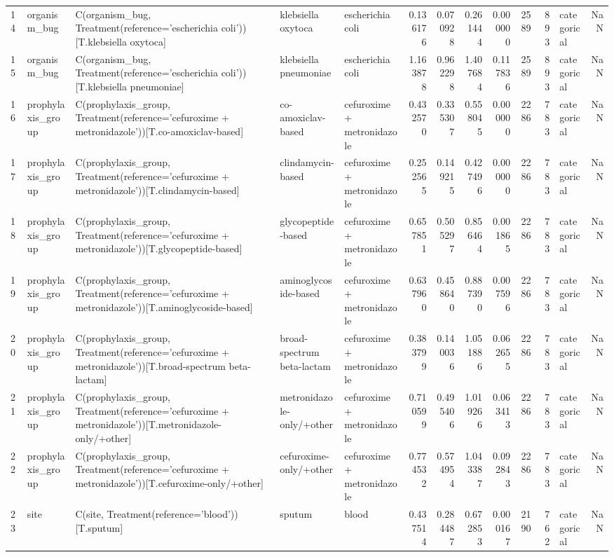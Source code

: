 \begin{tabular}{lllllrrrrrrlr}
14 & organism_bug & C(organism_bug, Treatment(reference='escherichia coli'))[T.klebsiella oxytoca] & klebsiella oxytoca & escherichia coli & 0.136176 & 0.070928 & 0.261444 & 0.000000 & 2589 & 893 & categorical & NaN \\
15 & organism_bug & C(organism_bug, Treatment(reference='escherichia coli'))[T.klebsiella pneumoniae] & klebsiella pneumoniae & escherichia coli & 1.163878 & 0.962298 & 1.407684 & 0.117836 & 2589 & 893 & categorical & NaN \\
16 & prophylaxis_group & C(prophylaxis_group, Treatment(reference='cefuroxime + metronidazole'))[T.co-amoxiclav-based] & co-amoxiclav-based & cefuroxime + metronidazole & 0.432570 & 0.335307 & 0.558045 & 0.000000 & 2286 & 783 & categorical & NaN \\
17 & prophylaxis_group & C(prophylaxis_group, Treatment(reference='cefuroxime + metronidazole'))[T.clindamycin-based] & clindamycin-based & cefuroxime + metronidazole & 0.252565 & 0.149215 & 0.427496 & 0.000000 & 2286 & 783 & categorical & NaN \\
18 & prophylaxis_group & C(prophylaxis_group, Treatment(reference='cefuroxime + metronidazole'))[T.glycopeptide-based] & glycopeptide-based & cefuroxime + metronidazole & 0.657851 & 0.505297 & 0.856464 & 0.001865 & 2286 & 783 & categorical & NaN \\
19 & prophylaxis_group & C(prophylaxis_group, Treatment(reference='cefuroxime + metronidazole'))[T.aminoglycoside-based] & aminoglycoside-based & cefuroxime + metronidazole & 0.637960 & 0.458640 & 0.887390 & 0.007596 & 2286 & 783 & categorical & NaN \\
20 & prophylaxis_group & C(prophylaxis_group, Treatment(reference='cefuroxime + metronidazole'))[T.broad-spectrum beta-lactam] & broad-spectrum beta-lactam & cefuroxime + metronidazole & 0.383799 & 0.140036 & 1.051886 & 0.062655 & 2286 & 783 & categorical & NaN \\
21 & prophylaxis_group & C(prophylaxis_group, Treatment(reference='cefuroxime + metronidazole'))[T.metronidazole-only/+other] & metronidazole-only/+other & cefuroxime + metronidazole & 0.710599 & 0.495406 & 1.019266 & 0.063413 & 2286 & 783 & categorical & NaN \\
22 & prophylaxis_group & C(prophylaxis_group, Treatment(reference='cefuroxime + metronidazole'))[T.cefuroxime-only/+other] & cefuroxime-only/+other & cefuroxime + metronidazole & 0.774532 & 0.574954 & 1.043387 & 0.092843 & 2286 & 783 & categorical & NaN \\
23 & site & C(site, Treatment(reference='blood'))[T.sputum] & sputum & blood & 0.437514 & 0.284487 & 0.672853 & 0.000167 & 2190 & 762 & categorical & NaN \\

\end{tabular}
